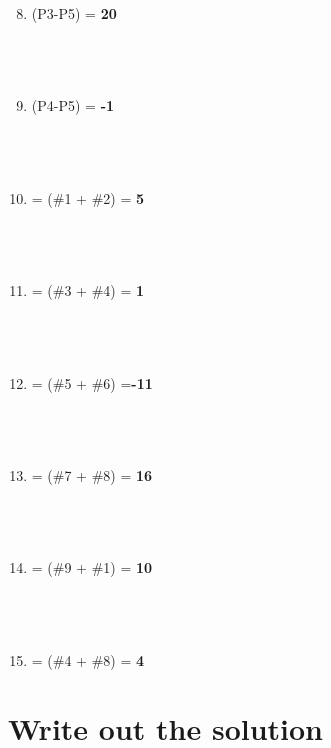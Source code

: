 \documentclass[12pt]{article}
\begin{document}
\begin{minipage}[t]{0.6\textwidth}
    \begin{enumerate}[\#1]
        \setcounter{enumi}{7} %
        \item (P3-P5) = \textbf{20}
        \\\\\\\\
        \item (P4-P5) = \textbf{-1}
        \\\\\\\\
        \item = (\#1 + \#2) = \textbf{5}
        \\\\\\\\
        \item = (\#3 + \#4) = \textbf{1}
        \\\\\\\\
        \item = (\#5 + \#6) =\textbf{-11}
        \\\\\\\\
        \item = (\#7 + \#8) = \textbf{16}
        \\\\\\\\
        \item = (\#9 + \#1) = \textbf{10}
        \\\\\\\\
        \item = (\#4 + \#8) = \textbf{4}

    \end{enumerate}
\end{minipage}
\vspace{2cm}
\section*{Write out the solution}


\end{document}
